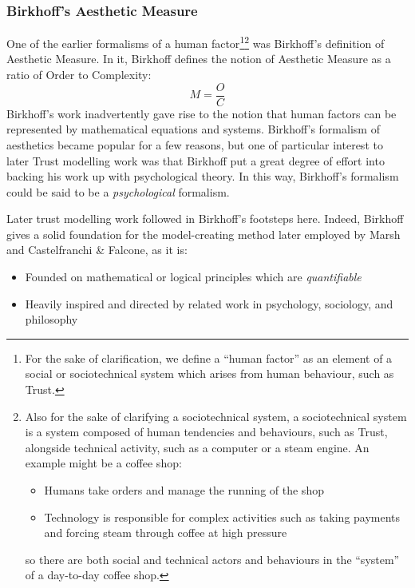 \subsubsection{Birkhoff's Aesthetic Measure}\label{subsubsec:birkhoff}
One of the earlier formalisms of a human factor\footnote{For the sake of clarification, we define a ``human factor'' as an element of a social or sociotechnical system which arises from human behaviour, such as Trust.}\footnote{Also for the sake of clarifying a sociotechnical system, a sociotechnical system is a system composed of human tendencies and behaviours, such as Trust, alongside technical activity, such as a computer or a steam engine. An example might be a coffee shop: \begin{itemize}
    \item Humans take orders and manage the running of the shop
    \item Technology is responsible for complex activities such as taking payments and forcing steam through coffee at high pressure
\end{itemize} so there are both social and technical actors and behaviours in the ``system'' of a day-to-day coffee shop.} was Birkhoff's definition of Aesthetic Measure\cite{BirkhoffAESTHETICMEASURE}. In it, Birkhoff defines the notion of Aesthetic Measure as a ratio of Order to Complexity:
\[M = \frac{O}{C}\]
Birkhoff's work inadvertently gave rise to the notion that human factors can be represented by mathematical equations and systems. Birkhoff's formalism of aesthetics became popular for a few reasons, but one of particular interest to later Trust modelling work was that Birkhoff put a great degree of effort into backing his work up with psychological theory. In this way, Birkhoff's formalism could be said to be a \emph{psychological} formalism. \par

Later trust modelling work followed in Birkhoff's footsteps here. Indeed, Birkhoff gives a solid foundation for the model-creating method later employed by Marsh\cite{Marsh1994FormalisingConcept} and Castelfranchi \& Falcone, as it is:
\begin{itemize}
    \item Founded on mathematical or logical principles which are \emph{quantifiable}
    \item Heavily inspired and directed by related work in psychology, sociology, and philosophy
\end{itemize}\par

